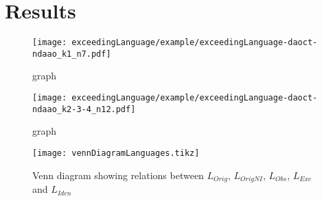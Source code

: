 \chapter{Results}

\begin{figure}[H]
  \centering
  \texttt{[image: exceedingLanguage/example/exceedingLanguage-daoct-ndaao\_k1\_n7.pdf]}
  \caption{graph}
\end{figure}

\begin{figure}[H]
  \centering
  \texttt{[image: exceedingLanguage/example/exceedingLanguage-daoct-ndaao\_k2-3-4\_n12.pdf]}
  \caption{graph}
\end{figure}


\usetikzlibrary{patterns}
\begin{figure}[H]
  \centering
  \texttt{[image: vennDiagramLanguages.tikz]}
  \caption{Venn diagram showing relations between $L_{Orig}$, $L_{OrigNI}$,
    $L_{Obs}$, $L_{Exc}$ and $L_{Iden}$}
\end{figure}
